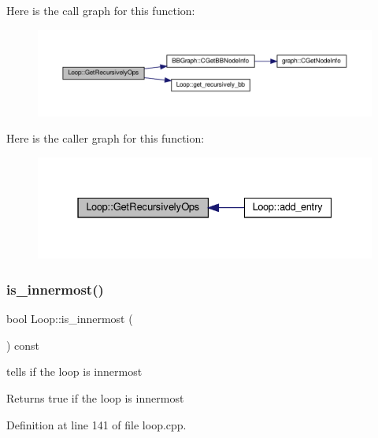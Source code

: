 Here is the call graph for this function\+:
\nopagebreak
\begin{figure}[H]
\begin{center}
\leavevmode
\includegraphics[width=350pt]{de/d77/classLoop_a03dccc95debe3862b1827f28585300c8_cgraph}
\end{center}
\end{figure}
Here is the caller graph for this function\+:
\nopagebreak
\begin{figure}[H]
\begin{center}
\leavevmode
\includegraphics[width=331pt]{de/d77/classLoop_a03dccc95debe3862b1827f28585300c8_icgraph}
\end{center}
\end{figure}
\mbox{\label{classLoop_aafb1d20818809c8c863c962ba53e2984}} 
\subsubsection{\texorpdfstring{is\+\_\+innermost()}{is\_innermost()}}
{\footnotesize\ttfamily bool Loop\+::is\+\_\+innermost (\begin{DoxyParamCaption}{ }\end{DoxyParamCaption}) const}



tells if the loop is innermost 

\begin{DoxyReturn}{Returns}
true if the loop is innermost 
\end{DoxyReturn}


Definition at line 141 of file loop.\+cpp.



